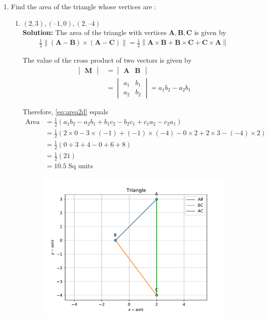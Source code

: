 \documentclass[12pt]{article}
\let\vec\mathbf
\newcommand{\mydet}[1]{\ensuremath{\begin{vmatrix}#1\end{vmatrix}}}
\providecommand{\brak}[1]{\ensuremath{\left(#1\right)}}
\providecommand{\norm}[1]{\left\lVert#1\right\rVert}
\newcommand{\solution}{\noindent \textbf{Solution: }}
\begin{document}
\begin{enumerate}
\item Find the area of the triangle whose vertices are :
\begin{enumerate}
\item $(2, 3), (–1, 0), (2, – 4)$  \\
\solution The area of the triangle with vertices $\vec{A}, \vec{B}, \vec{C}$ is given by  
  \label{prop:area2d}
  \begin{align}
    \label{eq:area2d}
	\frac{1}{2}\norm{\brak{\vec{A}-\vec{B}} \times \brak{\vec{A}-\vec{C}}}
 = 
 \frac{1}{2}\norm{\vec{A} \times \vec{B}+\vec{B} \times \vec{C}+\vec{C} \times \vec{A}}
\end{align}

The value of the cross product of two vectors is given by \\

\begin{align}
  \label{eq:det2d}
  \mydet{\vec{M}} &= \mydet{\vec{A} & \vec{B}} 
  \\
  &= \mydet{a_1 & b_1\\a_2 & b_2} = a_1b_2 - a_2 b_1
\end{align}

		Therefore, \eqref{eq:area2d} equals \\
\begin{align}
	\text{Area} &=	\frac{1}{2}\brak{a_1b_2 - a_2 b_1 + b_1c_2 - b_2 c_1 + c_1a_2 - c_2 a_1}  \\
	&=	\frac{1}{2}\brak{2 \times 0 - 3 \times \brak{-1} + \brak{-1}\times \brak{-4} - 0 \times 2 + 2 \times 3 - \brak{-4} \times 2}  \\
	&=\frac{1}{2}\brak{0 + 3  + 4 - 0 + 6 + 8} \\
	&=\frac{1}{2}\brak{21}  \\
	&=10.5 \text{ Sq units}	       
\end{align}

\begin{figure}[!h]
	\begin{center}
		\includegraphics[width=\columnwidth]{./figs/problem1a.pdf}
	\end{center}
\caption{}
\label{fig:Fig1}
\end{figure}


\end{enumerate}
\end{enumerate}
\end{document}
